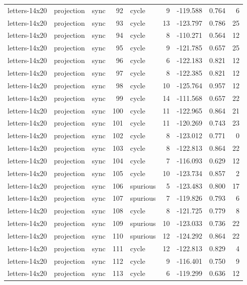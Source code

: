 \begin{tabular}{lllrlrrrr}
letters-14x20 & projection & sync & 92 & cycle & 9 & -119.588 & 0.764 & 6 \\
letters-14x20 & projection & sync & 93 & cycle & 13 & -123.797 & 0.786 & 25 \\
letters-14x20 & projection & sync & 94 & cycle & 8 & -110.271 & 0.564 & 12 \\
letters-14x20 & projection & sync & 95 & cycle & 9 & -121.785 & 0.657 & 25 \\
letters-14x20 & projection & sync & 96 & cycle & 6 & -122.183 & 0.821 & 12 \\
letters-14x20 & projection & sync & 97 & cycle & 8 & -122.385 & 0.821 & 12 \\
letters-14x20 & projection & sync & 98 & cycle & 10 & -125.764 & 0.957 & 12 \\
letters-14x20 & projection & sync & 99 & cycle & 14 & -111.568 & 0.657 & 22 \\
letters-14x20 & projection & sync & 100 & cycle & 11 & -122.965 & 0.864 & 21 \\
letters-14x20 & projection & sync & 101 & cycle & 11 & -120.269 & 0.743 & 23 \\
letters-14x20 & projection & sync & 102 & cycle & 8 & -123.012 & 0.771 & 0 \\
letters-14x20 & projection & sync & 103 & cycle & 8 & -122.813 & 0.864 & 22 \\
letters-14x20 & projection & sync & 104 & cycle & 7 & -116.093 & 0.629 & 12 \\
letters-14x20 & projection & sync & 105 & cycle & 10 & -123.734 & 0.857 & 2 \\
letters-14x20 & projection & sync & 106 & spurious & 5 & -123.483 & 0.800 & 17 \\
letters-14x20 & projection & sync & 107 & spurious & 7 & -119.826 & 0.793 & 6 \\
letters-14x20 & projection & sync & 108 & cycle & 8 & -121.725 & 0.779 & 8 \\
letters-14x20 & projection & sync & 109 & spurious & 10 & -123.033 & 0.736 & 22 \\
letters-14x20 & projection & sync & 110 & spurious & 12 & -124.292 & 0.864 & 22 \\
letters-14x20 & projection & sync & 111 & cycle & 12 & -122.813 & 0.829 & 4 \\
letters-14x20 & projection & sync & 112 & cycle & 9 & -116.401 & 0.750 & 9 \\
letters-14x20 & projection & sync & 113 & cycle & 6 & -119.299 & 0.636 & 12 \\

\end{tabular}
